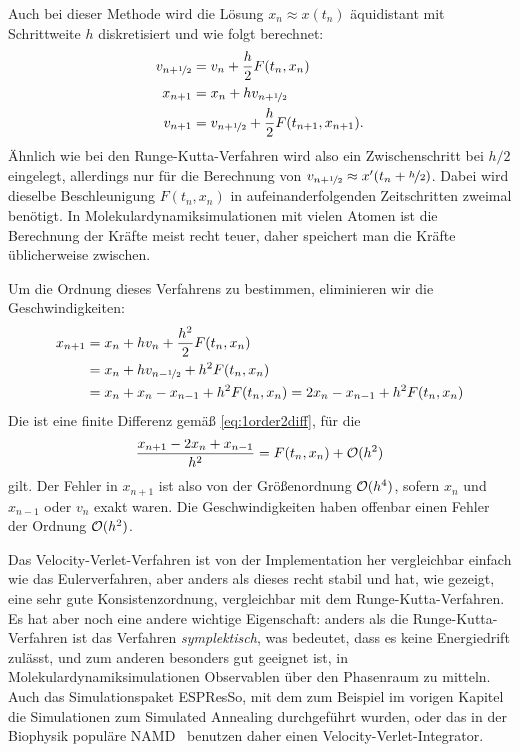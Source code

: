 Auch bei dieser Methode wird die Lösung $x_n\approx x(t_n)$
äquidistant mit Schrittweite $h$ diskretisiert und wie folgt
berechnet:
\begin{align}
  v_{n+\nicefrac{1}{2}} &= v_n + \frac{h}{2} F(t_n, x_n) \nonumber\\
  x_{n+1} &= x_n + h v_{n+\nicefrac{1}{2}} \\
  v_{n+1} &= v_{n+\nicefrac{1}{2}} + \frac{h}{2} F(t_{n+1}, x_{n+1}).\nonumber
\end{align}
Ähnlich wie bei den Runge-Kutta-Verfahren wird also ein
Zwischenschritt bei $h/2$ eingelegt, allerdings nur für die Berechnung
von $v_{n+\nicefrac{1}{2}}\approx x'(t_n + \nicefrac{h}{2})$.  Dabei
wird dieselbe Beschleunigung $F(t_n, x_n)$ in aufeinanderfolgenden
Zeitschritten zweimal benötigt. In Molekulardynamiksimulationen mit
vielen Atomen ist die Berechnung der Kräfte meist recht teuer, daher
speichert man die Kräfte üblicherweise zwischen.

Um die Ordnung dieses Verfahrens zu bestimmen, eliminieren wir die
Geschwindigkeiten:
\begin{align}
  x_{n+1} &= x_n + h v_n + \frac{h^2}{2} F(t_n, x_n)\nonumber\\
  &=  x_n + h v_{n-\nicefrac{1}{2}} + h^2F(t_n, x_n)\nonumber\\
  &=  x_n + x_n - x_{n-1} + h^2F(t_n, x_n)
  =  2 x_n - x_{n-1} + h^2F(t_n, x_n)
\end{align}
Die ist eine finite Differenz gemäß \eqref{eq:1order2diff}, für die
\begin{equation}
  \frac{x_{n+1}  - 2 x_n + x_{n-1}}{h^2} = F(t_n, x_n) + \mathcal O(h^2)
\end{equation}
gilt. Der Fehler in $x_{n+1}$ ist also von der Größenordnung
$\mathcal O(h^4)$, sofern $x_n$ und $x_{n-1}$ oder $v_n$ exakt waren. Die
Geschwindigkeiten haben offenbar einen Fehler der Ordnung $\mathcal O(h^2)$.

Das Velocity-Verlet-Verfahren ist von der Implementation her
vergleichbar einfach wie das Eulerverfahren, aber anders als dieses
recht stabil und hat, wie gezeigt, eine sehr gute Konsistenzordnung,
vergleichbar mit dem Runge-Kutta-Verfahren. Es hat aber noch eine
andere wichtige Eigenschaft: anders als die Runge-Kutta-Verfahren ist
das Verfahren \emph{symplektisch}, was bedeutet, dass es keine
Energiedrift zulässt, und zum anderen besonders gut geeignet ist, in
Molekulardynamiksimulationen Observablen über den Phasenraum zu
mitteln.  Auch das Simulationspaket ESPResSo, mit dem zum Beispiel im
vorigen Kapitel die Simulationen zum Simulated Annealing durchgeführt
wurden, oder das in der Biophysik populäre NAMD~\cite{namd} benutzen
daher einen Velocity-Verlet-Integrator.


